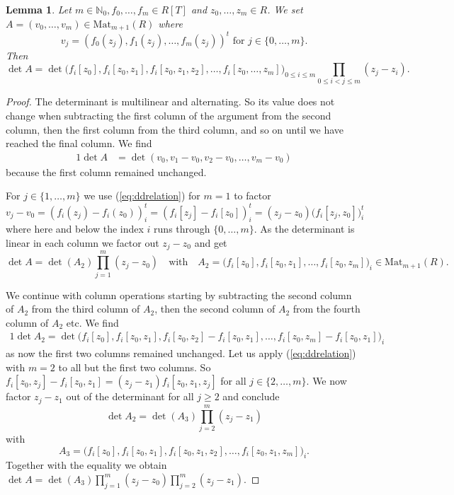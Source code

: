 \documentclass[12pt,oneside,a4]{amsart}
\newcommand{\IN}{\mathbb{N}}
\newcommand{\mat}[1]{\mathrm{Mat}_{#1}}
\newcommand{\trans}[1]{{#1}^{t}}
\newcounter{maincounter}
\numberwithin{maincounter}{section}
\numberwithin{equation}{section}
\newtheorem{lemma}[maincounter]{Lemma}
\renewcommand{\mat}{\mathrm{Mat}}
\begin{document}
\begin{lemma}
  \label{lem:vandermonde}
  Let $m\in\IN_0,f_0,\ldots,f_m\in R[T]$ and $z_0,\ldots,z_m\in R$. We set  
    $A = (v_0,\ldots,v_m)\in \mathrm{Mat}_{m+1}(R)$
  where
  \begin{equation*}    
    v_j=\trans{(f_0(z_j),f_1(z_j),\ldots,f_m(z_j))}\text{ for }j\in \{0,\ldots,m\}.
  \end{equation*}  
  Then
  \begin{equation}
    \label{eq:genvandermonde}
    \det A = 
    \det
    \bigl(f_i[z_0],f_i[z_0,z_1],f_i[z_0,z_1,z_2],\ldots,f_i[z_0,\ldots,z_m]\bigr)_{0\le
      i\le m}\prod_{0\le i<j\le m} (z_j-z_i).
  \end{equation}
\end{lemma} 
\begin{proof}
  The determinant is multilinear and alternating. So its value does
  not change  when
  subtracting the first column of the argument from the second column, then the first
  column from the third column, and so on until we have reached the
  final column.   We find
  \begin{alignat*}1
    \det A &=
    \det(v_0,v_1-v_0,v_2-v_0,\ldots,v_m-v_0)
  \end{alignat*}
  because the first column remained unchanged. 

  For $j\in \{1,\ldots,m\}$ we use (\ref{eq:ddrelation}) for $m=1$  
  to  factor
  $v_j-v_{0} = (f_i(z_j)-f_i(z_0))^t_{i} = (f_i[z_j]-f_i[z_0])_i^t
  = (z_j-z_{0})
  \bigl(f_i[z_j,z_0]\bigr)_i^t$
  where here and below the index $i$
  runs through $\{0,\ldots,m\}$. 
  As the determinant  is linear in each  column we factor out
  $z_j-z_0$ and get
  \begin{equation*}
    \det A = 
    \det(A_2)\prod_{j=1}^m (z_j-z_0) \quad\text{with}\quad
    A_2=
    \bigl( f_i[z_0], f_i[z_0,z_1], \ldots ,f_i[z_0,z_m]\bigr)_{i} \in
    \mat_{m+1}(R).
  \end{equation*}
  
  We continue with column operations starting by  subtracting the second
  column of $A_2$ from the third column of $A_2$, then the second column
  of $A_2$ from the fourth column of $A_2$ etc. 
   We find
  \begin{alignat*}1
    \det A_2 = \det \bigl(f_i[z_0], f_i[z_0,z_1], f_i[z_0,z_2]-f_i[z_0,z_1],
    \ldots,
    f_i[z_0,z_m]-f_i[z_0,z_1] \bigr)_i
  \end{alignat*}
  as now the first two columns remained unchanged. 
  Let us apply (\ref{eq:ddrelation}) with $m=2$ to all but the first two
  columns. So $f_i[z_0,z_j]-f_i[z_0,z_1] = (z_j-z_1) f_i[z_0,z_1,z_j]$
  for all $j\in \{2,\ldots,m\}$. We now factor  $z_j-z_1$ out of the
  determinant 
  for all $j\ge 2$ and
  conclude
  \begin{equation*}
    \det A_2 = \det(A_3)     \prod_{j=2}^m (z_j-z_1)    
  \end{equation*}
  with
  \begin{equation*}  
    A_3 = \bigl(f_i[z_0], f_i[z_0,z_1], f_i[z_0,z_1,z_2],
    \ldots,
    f_i[z_0,z_1,z_m] \bigr)_i.
  \end{equation*}
  Together with  the equality we obtain
  $\det A = \det(A_3)\prod_{j=1}^m (z_j-z_0)
     \prod_{j=2}^m (z_j-z_1)$. 


\end{proof}
\end{document}
